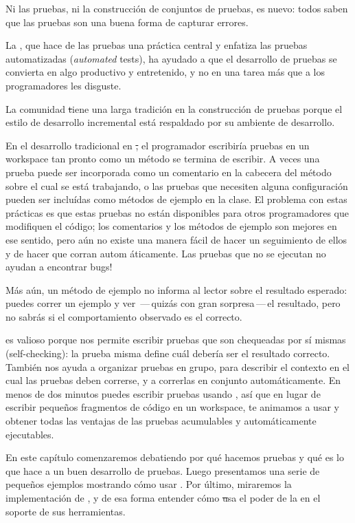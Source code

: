 \documentclass[a4paper,10pt,twoside]{book}
\begin{document}
Ni las pruebas, ni la construcci\'on de conjuntos de pruebas, es nuevo:  todos saben que  las pruebas son una buena forma de capturar errores.

La \mbox{,} que hace de las pruebas una pr\'actica central
y enfatiza las pruebas automatizadas (\emph{automated} tests), 
ha ayudado a que el desarrollo de pruebas se convierta en algo productivo y entretenido, y no en una tarea m\'as que a los programadores les disguste.

La comunidad \st tiene una larga tradici\'on en la construcci\'on de pruebas porque el estilo de desarrollo incremental est\'a respaldado por su ambiente de desarrollo.
  
En el desarrollo tradicional en \st , el programador escribir\'ia pruebas en un workspace 
tan pronto como un m\'etodo se termina de escribir.
A veces una prueba puede ser incorporada como un comentario en la cabecera
del m\'etodo sobre el cual se est\'a trabajando,
o las pruebas que necesiten alguna configuraci\'on pueden ser inclu\'idas como m\'etodos de ejemplo en la clase.
El problema con estas pr\'acticas es que estas pruebas no est\'an
disponibles para otros programadores que modifiquen el c\'odigo; los comentarios y los m\'etodos de ejemplo son mejores 
en ese sentido, pero a\'un no existe una manera f\'acil de hacer un seguimiento de ellos y de hacer que corran autom
\'aticamente.
\¡Las pruebas que no se ejecutan no ayudan a encontrar bugs!

M\'as a\'un, un m\'etodo de ejemplo no informa al lector sobre el resultado esperado:
puedes correr un ejemplo y ver \,---\,quiz\'as con gran sorpresa\,---\,el resultado, 
pero no sabr\'as si el comportamiento observado es el correcto.

\sunit es valioso porque nos permite escribir pruebas que son chequeadas por s\'i mismas (self-checking):
la prueba misma define cu\'al deber\'ia ser el resultado correcto.
Tambi\'en nos ayuda a organizar pruebas en grupo, para describir el contexto en el cual las pruebas deben correrse,
 y a correrlas en conjunto autom\'aticamente.
En menos de dos minutos puedes escribir pruebas usando \sunit, as\'i que en lugar de escribir peque\~nos fragmentos de c\'odigo en un workspace,
te animamos a usar \sunit y obtener todas las ventajas de las pruebas acumulables y autom\'aticamente ejecutables.

En este cap\'itulo comenzaremos debatiendo por qu\'e hacemos pruebas y qu\'e es lo que hace a un buen desarrollo de pruebas. Luego presentamos una serie de 
peque\~nos ejemplos mostrando c\'omo usar \sunit.
Por \'ultimo, miraremos la implementaci\'on de \sunit, y de esa forma entender c\'omo \st usa el poder de la  en el soporte de sus herramientas.
\end{document}
